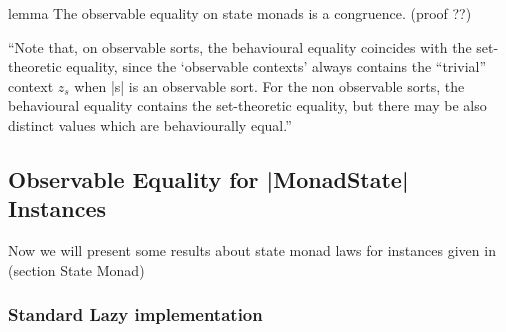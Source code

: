 \begin{definition}{lemma}
The observable equality on state monads is a congruence. (proof ??)
\end{definition}

``Note that, on observable sorts, the behavioural equality coincides
with the set-theoretic equality, since the `observable contexts'
always contains the ``trivial'' context $z_s$ when |s| is an
observable sort. For the non observable sorts, the behavioural
equality contains the set-theoretic equality, but there may be also
distinct values which are behaviourally equal.''

\begin{definition}{}
\end{definition}


\subsection{Observable Equality for |MonadState| Instances}

Now we will present some results about state monad laws for instances
given in (section State Monad) 

\subsubsection*{Standard Lazy implementation}

\begin{code}

\end{code}
